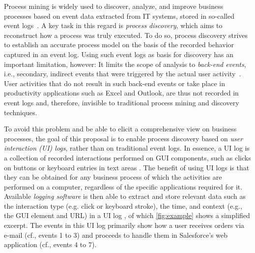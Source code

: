 \label{sec:startingpoint}

\vspace{-1em}

Process mining is widely used to discover, analyze, and improve business processes 
based on event data extracted from IT systems, stored in so-called event logs~\cite{van2016data}.
A key task in this regard is \emph{process discovery}, which aims to reconstruct how a process was truly executed. To do so, process discovery strives to establish an accurate process model on the basis of the recorded behavior captured in an event log.
Using such event logs as basis for discovery has an important limitation, however: It limits the scope of analysis to \textit{back-end events}, i.e., secondary, indirect events that were triggered by the actual user activity~\cite{diba2020extraction}. User activities that do not result in such back-end events or take place in productivity applications such as Excel and Outlook, are thus not recorded in event logs and, therefore, invisible to traditional process mining and discovery techniques. 

To avoid this problem and be able to elicit a comprehensive view on business processes, the goal of this proposal is to enable process discovery based on \textit{user interaction (UI) logs}, rather than on traditional event logs. In essence, a UI log is a collection of recorded interactions performed on GUI components, such as clicks on buttons or keyboard entries in text areas \cite{Urabe21}. The benefit of using UI logs is that they 
can be obtained for any business process of which the activities are performed on a computer, regardless of the specific applications required for it.
Available \textit{logging software} is then able to extract and store relevant data such as the interaction type (e.g. click or keyboard stroke), the time, and context (e.g., the GUI element and URL) in a UI log  \cite{leno2019action}, of which 
\autoref{fig:example} shows a simplified excerpt.
The events in this UI log primarily show how a user receives orders via e-mail (cf., events 1 to 3) and proceeds to handle them in Salesforce's web application (cf., events 4 to 7).


